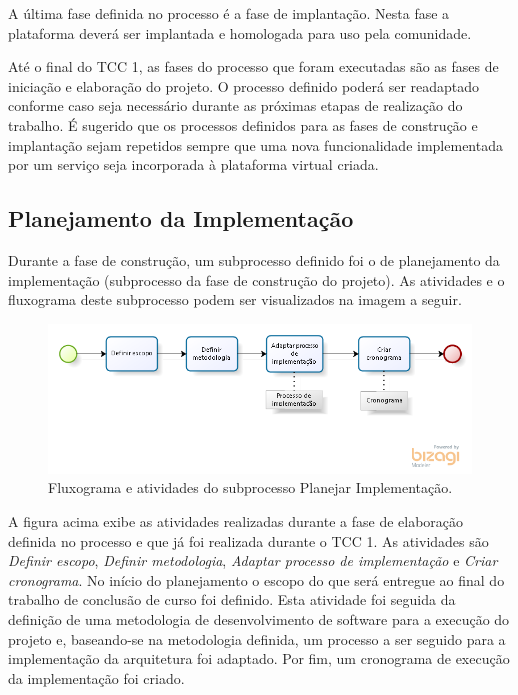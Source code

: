 A última fase definida no processo é a fase de implantação. Nesta fase a plataforma deverá ser implantada e homologada para uso pela comunidade.

Até o final do TCC 1, as fases do processo que foram executadas são as fases de iniciação e elaboração do projeto. O processo definido poderá ser readaptado conforme caso seja necessário durante as próximas etapas de realização do trabalho. É sugerido que os processos definidos para as fases de construção e implantação sejam repetidos sempre que uma nova funcionalidade implementada por um serviço seja incorporada à plataforma virtual criada.

\subsection{Planejamento da Implementação}
Durante a fase de construção, um subprocesso definido foi o de planejamento da implementação (subprocesso da fase de construção do projeto). As atividades e o fluxograma deste subprocesso podem ser visualizados na imagem a seguir.

\begin{figure}[htb]
\centering
\includegraphics[width=1\textwidth]{figuras/subprocesso_planejamento.PNG}
\caption{Fluxograma e atividades do subprocesso Planejar Implementação.}
\label{subprocesso_planejamento}
\end{figure}

A figura acima exibe as atividades realizadas durante a fase de elaboração definida no processo e que já foi realizada durante o TCC 1. As atividades são \textit{Definir escopo}, \textit{Definir metodologia}, \textit{Adaptar processo de implementação} e \textit{Criar cronograma}. No início do planejamento o escopo do que será entregue ao final do trabalho de conclusão de curso foi definido. Esta atividade foi seguida da definição de uma metodologia de desenvolvimento de software para a execução do projeto e, baseando-se na metodologia definida, um processo a ser seguido para a implementação da arquitetura foi adaptado. Por fim, um cronograma de execução da implementação foi criado.

